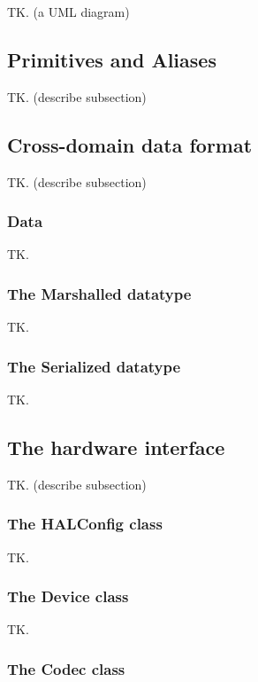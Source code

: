 \documentclass[11pt, oneside]{article}
\begin{document}
            TK. (a UML diagram)

        \subsection{Primitives and Aliases}

            TK. (describe subsection)

        \subsection{Cross-domain data format}

            TK. (describe subsection)

            \subsubsection{Data}

                TK.

            \subsubsection{The Marshalled datatype}

                TK.

            \subsubsection{The Serialized datatype}
            
                TK.

        \subsection{The hardware interface}

            TK. (describe subsection)

            \subsubsection{The HALConfig class}

                TK.

            \subsubsection{The Device class}

                TK.

            \subsubsection{The Codec class}
\end{document}
